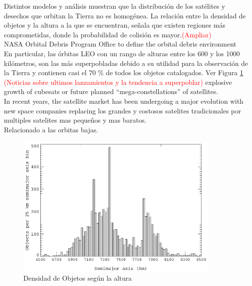 {Distintos modelos y an\'alisis muestran que la distribuci\'on de los sat\'elites y desechos que orbitan la Tierra no es homog\'enea. La relaci\'on entre la densidad de objetos y la altura a la que se encuentran, señala que existen regiones m\'as comprometidas, donde la probabilidad de colisi\'on es mayor.\textcolor{red}{(Ampliar)}\\
NASA Orbital Debris Program Office to define the orbital debris environment\\
En particular, las \'orbitas LEO con un rango de alturas entre los 600 y los 1000 kil\'ometros, son las m\'as superpobladas debido a su utilidad para la observaci\'on de la Tierra y contienen casi el 70 \% de todos los objetos catalogados. Ver Figura \ref{fig:Dvsaltura}
\textcolor{red}{(Noticias sobre ultimos lanzamientos y la tendencia a superpoblar)} 
explosive growth of cubesats or future planned “mega-constellations” of satellites.\\
In recent years, the satellite market has been undergoing a major evolution with new space companies replacing
los grandes y costosos satelites tradicionales por multiples satelites mas pequeños y mas baratos.\\
Relacionado a las orbitas bajas.\\

\begin{figure}[!h]
  \centering
  \includegraphics[width=0.9\textwidth]{imagenes/SDvsaltura2011}
  \caption[Distribuci\'on de Desechos seg\'un la altura en \'orbitas LEO]{Densidad de Objetos seg\'un la altura}
  \label{fig:Dvsaltura}
\end{figure}



}
